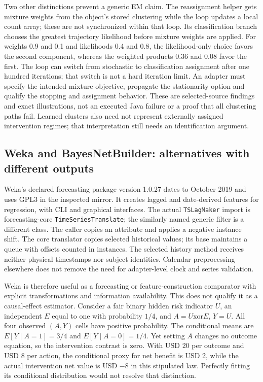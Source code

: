Two other distinctions prevent a generic EM claim. The reassignment helper
gets mixture weights from the object's stored clustering while the loop
updates a local count array; these are not synchronized within that loop.
Its classification branch chooses the greatest trajectory likelihood
before mixture weights are applied. For weights 0.9 and 0.1 and
likelihoods 0.4 and 0.8, the likelihood-only choice favors the second
component, whereas the weighted products 0.36 and 0.08 favor the first.
The loop can switch from stochastic to classification assignment after
one hundred iterations; that switch is not a hard iteration limit.
An adapter must specify the intended mixture objective, propagate the
stationarity option and qualify the stopping and assignment behavior.
These are selected-source findings and exact illustrations, not an
executed Java failure or a proof that all clustering paths fail. Learned
clusters also need not represent externally assigned intervention regimes;
that interpretation still needs an identification argument.
\citep{rel15multinet,rel15delegatewitnesses,exec15_javatemporal_learndbm}

\subsection{Weka and BayesNetBuilder: alternatives with different outputs}

Weka's declared forecasting package version 1.0.27 dates to October 2019 and
uses GPL3 in the inspected mirror. It creates lagged and date-derived features
for regression, with CLI and graphical interfaces. The actual
\texttt{TSLagMaker} import is forecasting-core \texttt{TimeSeriesTranslate};
the similarly named generic filter is a different class. The caller copies an
attribute and applies a negative instance shift. The core translator copies
selected historical values; its base maintains a queue with offsets counted
in instances. The selected history method receives neither physical
timestamps nor subject identities. Calendar preprocessing elsewhere does not
remove the need for adapter-level clock and series validation.
\citep{exec15_javatemporal_weka}

Weka is therefore useful as a forecasting or feature-construction comparator
with explicit transformations and information availability. This does not
qualify it as a causal-effect estimator. Consider a fair binary hidden risk
indicator $U$, an independent $E$ equal to one with probability $1/4$, and
$A=U\mathbin{\mathrm{xor}}E$, $Y=U$. All four observed $(A,Y)$ cells have
positive probability. The conditional means are
$E[Y\mid A=1]=3/4$ and $E[Y\mid A=0]=1/4$. Yet setting $A$ changes no outcome
equation, so the intervention contrast is zero. With USD 20 per outcome and
USD 8 per action, the conditional proxy for net benefit is USD 2, while the
actual intervention net value is USD $-8$ in this stipulated law. Perfectly
fitting its conditional distribution would not resolve that distinction.
\citep{exec15_javatemporal_exact}

